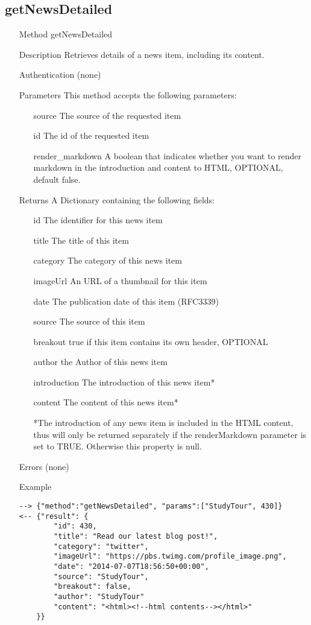 \documentclass[a4paper]{scrreprt}
\begin{document}
\subsection{getNewsDetailed}
\begin{enumerate}
\item[Method] getNewsDetailed
\item[Description] Retrieves details of a news item, including its content.
\item[Authentication] (none)
\item[Parameters] This method accepts the following parameters:
\begin{enumerate}
	\item[source] The source of the requested item
	\item[id] The id of the requested item
    \item[render\_markdown] A boolean that indicates whether you want to render markdown in the introduction and content to HTML, OPTIONAL, default false.
    \end{enumerate}
\item[Returns] A Dictionary containing the following fields:
\begin{enumerate}
    \item[id] The identifier for this news item
    \item[title] The title of this item
	\item[category] The category of this news item
    \item[imageUrl] An URL of a thumbnail for this item
    \item[date] The publication date of this item (RFC3339)
    \item[source] The source of this item
    \item[breakout] true if this item contains its own header, OPTIONAL
    \item[author] the Author of this news item
    \item[introduction] The introduction of this news item*
    \item[content] The content of this news item*
    \item[] *The introduction of any news item is included in the HTML content, thus will only be returned separately if the renderMarkdown parameter is set to TRUE. Otherwise this property is null.
	\end{enumerate}
\item[Errors] (none)
\item[Example]
\begin{lstlisting}
--> {"method":"getNewsDetailed", "params":["StudyTour", 430]}
<-- {"result": {
        "id": 430,
        "title": "Read our latest blog post!",
        "category": "twitter",
        "imageUrl": "https://pbs.twimg.com/profile_image.png",
        "date": "2014-07-07T18:56:50+00:00",
        "source": "StudyTour",
        "breakout": false,
        "author": "StudyTour"
        "content": "<html><!--html contents--></html>"
    }}
\end{lstlisting}
\end{enumerate}
\end{document}
